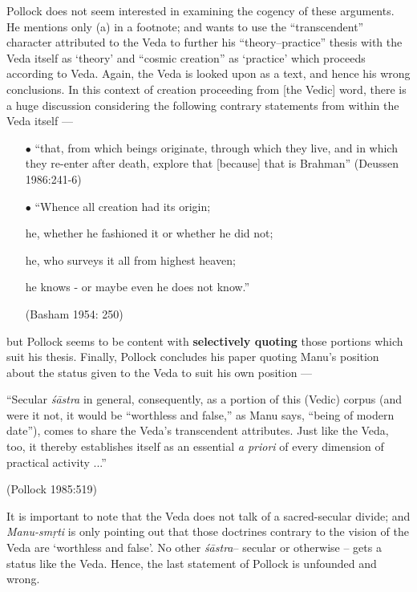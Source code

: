 Pollock does not seem interested in examining the cogency of these arguments. He mentions only (a) in a footnote; and wants to use the ``transcendent'' character attributed to the Veda to further his ``theory–practice'' thesis with the Veda itself as `theory' and ``cosmic creation'' as `practice' which proceeds according to Veda. Again, the Veda is looked upon as a text, and hence his wrong conclusions. In this context of creation proceeding from [the Vedic] word, there is a huge discussion considering the following contrary statements from within the Veda itself ---
\begin{itemize}
\itemsep=1pt
\item[$\bullet$] ``that, from which beings originate, through which they live, and in which they re-enter after death, explore that [because] that is Brahman'' (Deussen 1986:241-6)

\item[$\bullet$] ``Whence all creation had its origin; 

he, whether he fashioned it or whether he did not;

he, who surveys it all from highest heaven; 

he knows - or maybe even he does not know.'' 

\hfill (Basham 1954: 250)
\end{itemize}
but Pollock seems to be content with {\bf selectively quoting} those portions which suit his thesis. Finally, Pollock concludes his paper quoting Manu's position about the status given to the Veda to suit his own position ---
\begin{myquote}
``Secular {\sl śāstra} in general, consequently, as a portion of this (Vedic) corpus (and were it not, it would be ``worthless and false,'' as Manu says, ``being of modern date''), comes to share the Veda's transcendent attributes. Just like the Veda, too, it thereby establishes itself as an essential {\sl a priori} of every dimension of practical activity ...'' 

\hfill (Pollock 1985:519)
\end{myquote}

It is important to note that the Veda does not talk of a sacred-secular divide; and {\sl Manu-smṛti} is only pointing out that those doctrines contrary to the vision of the Veda are `worthless and false'. No other {\sl śāstra}-- secular or otherwise -- gets a status like the Veda. Hence, the last statement of Pollock is unfounded and wrong.

